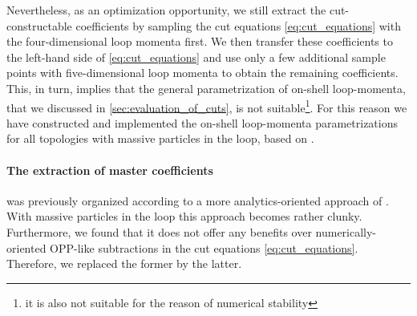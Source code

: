 Nevertheless, as an optimization opportunity,
we still extract the cut-constructable coefficients by sampling 
the cut equations \eqref{eq:cut_equations} 
with the four-dimensional loop momenta first.
We then transfer these coefficients to the left-hand side of \cref{eq:cut_equations} and use only a few additional
sample points with five-dimensional loop momenta to obtain the remaining coefficients.
This, in turn, implies that the general parametrization of on-shell loop-momenta, that we discussed in \cref{sec:evaluation_of_cuts},
is not suitable\footnote{
  it is also not suitable for the reason of numerical stability
}. For this reason we have constructed and implemented the on-shell loop-momenta parametrizations
for all topologies with massive particles in the loop, based on \cite{Kilgore:2007qr}.



\paragraph{The extraction of master coefficients} was previously organized according to a more analytics-oriented approach of \cite{Forde2007}.
With massive particles in the loop this approach becomes rather clunky.
Furthermore, we found that it does not offer any benefits over numerically-oriented OPP-like subtractions
in the cut equations \eqref{eq:cut_equations}. Therefore, we replaced the former by the latter.


